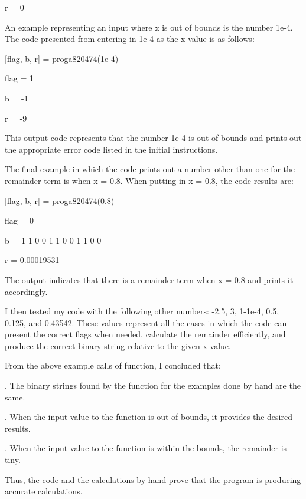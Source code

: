 \documentclass{article}
\begin{document}
{{r =
     0
}
\par \medskip
      {\color{black}  An example representing an input where x is out of bounds is the number 1e-4.  The code presented from entering in 1e-4 as the x value is as follows:
      }
\par \medskip
{\color{black}
[flag, b, r] = proga820474(1e-4)
\par \medskip
flag =
     1
\par \medskip
b =
    -1
\par \medskip
r =
    -9
}
\par \medskip
      {\color{black} This output code represents that the number 1e-4 is out of bounds and prints out the appropriate error code listed in the initial instructions. 
      }
\par \medskip
      {\color{black}  The final example in which the code prints out a number other than one for the remainder term is when x = 0.8.  When putting in x = 0.8, the code results are:
      }
\par \medskip
{\color{black}
[flag, b, r] = proga820474(0.8)
\par \medskip
flag =
     0
\par \medskip
b =
     1
     1
     0
     0
     1
     1
     0
     0
     1
     1
     0
     0
\par \medskip
r =
   0.00019531
 }
\par \medskip
      {\color{black} The output indicates that there is a remainder term when x = 0.8 and prints it accordingly. 
      }
\par \medskip
      {\color{black}      I then tested my code with the following other numbers: -2.5, 3, 1-1e-4, 0.5, 0.125, and 0.43542.  These values represent all the cases in which the code can present the correct flags when needed, calculate the remainder efficiently, and produce the correct binary string relative to the given x value.
      }
\par \medskip
      {\color{black}  From the above example calls of function, I concluded that: 
	    \par {}. The binary strings found by the function for the examples done by hand are the same. 
	    \par {}. When the input value to the function is out of bounds, it provides the desired results.
	    \par {}. When the input value to the function is within the bounds, the remainder is tiny.  
	    \par \medskip
	  }
\par \medskip
	  {\color{black} Thus, the code and the calculations by hand prove that the program is producing accurate calculations.
     }
} 

\par \medskip



\end{document}
